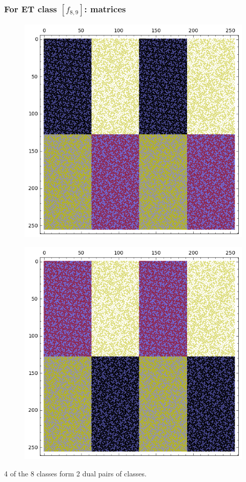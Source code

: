 \documentclass[pdf,sprung,slideColor,nocolorBG]{beamer}
\begin{document}
\begin{frame}
\frametitle{For ET class $[f_{8,9}]$: matrices}
\begin{figure}
\centering
\begin{minipage}{.48\textwidth}
  \centering
  \includegraphics[width=.9\linewidth]{../matrix_plot/c8_9_bent_cayley_graph_index_matrix.png}
  \label{fig:c8_9_bent_cayley_graph_index_matrix}
\end{minipage}
\begin{minipage}{.48\textwidth}
  \centering
  \includegraphics[width=.9\linewidth]{../matrix_plot/c8_9_dual_cayley_graph_index_matrix.png}
  \label{fig:c8_9_dual_cayley_graph_index_matrix}
\end{minipage}%
\end{figure}
4 of the 8 classes form 2 dual pairs of classes.
\end{frame}
\end{document}
